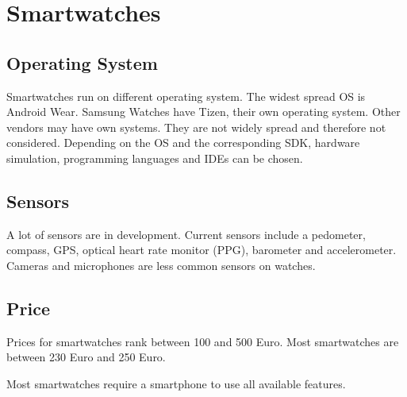 \section{Smartwatches}

\subsection{Operating System}
Smartwatches run on different operating system. The widest spread OS is Android Wear. Samsung Watches have Tizen, their own operating system.
Other vendors may have own systems. They are not widely spread and therefore not considered. Depending on the OS and the corresponding SDK, hardware simulation, programming languages and IDEs can be chosen. 

\subsection{Sensors}
A lot of sensors are in development. Current sensors include a pedometer, compass, GPS, optical heart rate monitor (PPG), barometer and accelerometer. Cameras and microphones are less common sensors on watches.

\subsection{Price}
Prices for smartwatches rank between 100 and 500 Euro. Most smartwatches are between 230 Euro and 250 Euro.

Most smartwatches require a smartphone to use all available features.

